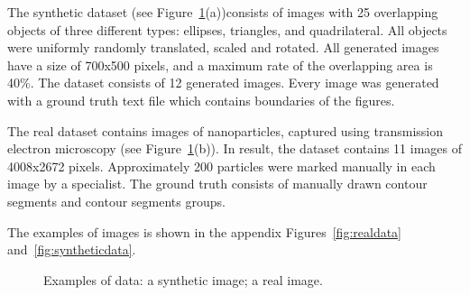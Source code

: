 \documentclass{lutmscthesis}[2010/09/22]
\begin{document}
The synthetic dataset (see Figure~\ref{fig:imex}(a))consists of images with 25 overlapping
objects of three different types: ellipses, triangles, and quadrilateral. All objects were uniformly randomly translated, scaled and rotated. All generated images have a size of 700x500 pixels, and a maximum rate of the overlapping area is 40\%. The dataset consists of 12 generated images. Every image was generated with a ground truth text file which contains boundaries of the figures.

The real dataset contains images of nanoparticles, captured
using transmission electron microscopy (see Figure~\ref{fig:imex}(b)). In result, the dataset contains 11 images of 4008x2672 pixels. Approximately 200 particles were marked manually in each image by a specialist. The ground truth consists of manually drawn contour segments and contour segments groups. 

The examples of images is shown in the appendix Figures~\ref{fig:realdata} and~\ref{fig:syntheticdata}.

\begin{figure}[ht]
    \centering
    
    \caption[]{
        Examples of data:
         a synthetic image;
         a real image.
    }
         
        \label{fig:imex}
\end{figure}
\end{document}
